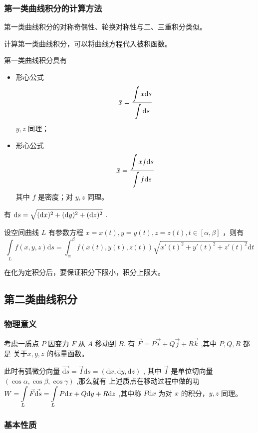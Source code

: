 \subsubsection{第一类曲线积分的计算方法}


第一类曲线积分的对称奇偶性、轮换对称性与二、三重积分类似。

计算第一类曲线积分，可以将曲线方程代入被积函数。

第一类曲线积分具有
\begin{itemize}
    \item 形心公式$$
        \bar x = \dfrac{\displaystyle \int x\mathrm{d}s}{\displaystyle \int \mathrm{d}s}
    $$ $ y,z $ 同理；
    \item 形心公式$$
        \bar x = \dfrac{\displaystyle \int xf\mathrm{d}s}{\displaystyle \int f\mathrm{d}s}
    $$ 其中 $ f $ 是密度；对 $ y,z $ 同理。
\end{itemize}


有 $ \displaystyle \mathrm{d}s = \sqrt{(\mathrm{d}x)^2+(\mathrm{d}y)^2+(\mathrm{d}z)^2} $ .

设空间曲线 $ L $ 有参数方程 $ x = x(t),y = y(t),z = z(t), t\in [\alpha,\beta] $ ，则有
$$
    \int\limits_L f(x,y,z)\mathrm{d}s =
    \int_\alpha^\beta f(x(t),y(t),z(t))\sqrt{x'(t)^2+y'(t)^2+z'(t)^2}\mathrm{d}t
$$ 

在化为定积分后，要保证积分下限小，积分上限大。

\subsection{第二类曲线积分}

\subsubsection{物理意义}

考虑一质点 $ P $ 因变力 $ F $ 从 $ A $ 移动到 $ B $. 
有 $ \vec{F} = P\vec i+Q\vec j+R\vec k $ ,其中 $ P,Q,R $ 都是
关于$ x,y,z $ 的标量函数。

此时有弧微分向量 $ \vec{\mathrm{d}s} = \vec I\mathrm{d}s = (\mathrm{d}x,\mathrm{d}y,\mathrm{d}z) $ ,
其中 $ \vec I $ 是单位切向量 $ (\cos \alpha,\cos\beta, \cos \gamma) $ ,那么就有
上述质点在移动过程中做的功 $ \displaystyle W = \int\limits_L \vec F \vec{\mathrm{d}s}
= \int\limits_L P\mathrm{d}x+Q\mathrm{d}y+R\mathrm{d}z $ ,其中称 $ P\mathrm{d}x $ 为对 $ x $ 的积分，$ y,z $ 同理。

\subsubsection{基本性质}

